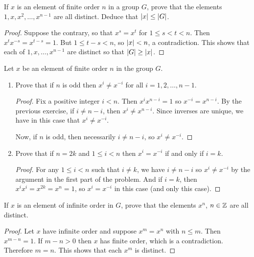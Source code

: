  If $x$ is an element of finite order $n$ in a group $G$,
prove that the elements $1, x, x^2, \dots, x^{n-1}$ are all
distinct. Deduce that $\lvert{x}\rvert\leq\lvert{G}\rvert$.
\begin{proof}
  Suppose the contrary, so that $x^s = x^t$ for $1\leq s < t<n$. Then
  $x^tx^{-s} = x^{t-s} = 1$. But $1\leq t-s < n$, so $\lvert{x}\rvert < n$, a
  contradiction. This shows that each of $1, x,\dots,x^{n-1}$ are
  distinct so that $\lvert{G}\rvert\geq\lvert{x}\rvert$.
\end{proof}

 Let $x$ be an element of finite order $n$ in the group
$G$.
\begin{enumerate}
\item Prove that if $n$ is odd then $x^i\neq x^{-i}$ for all
  $i = 1, 2, \dots, n-1$.
  \begin{proof}
    Fix a positive integer $i < n$. Then $x^ix^{n-i} = 1$ so
    $x^{-i} = x^{n-i}$. By the previous exercise, if $i\neq n-i$, then
    $x^i\neq x^{n-i}$. Since inverses are unique, we have in this case
    that $x^i\neq x^{-i}$.

    Now, if $n$ is odd, then necessarily $i\neq n-i$, so
    $x^i\neq x^{-i}$.
  \end{proof}
\item Prove that if $n = 2k$ and $1\leq i < n$ then $x^i = x^{-i}$ if
  and only if $i = k$.
  \begin{proof}
    For any $1\leq i<n$ such that $i\neq k$, we have $i\neq n-i$ so
    $x^i\neq x^{-i}$ by the argument in the first part of the
    problem. And if $i = k$, then $x^ix^i = x^{2k} = x^n = 1$, so
    $x^i = x^{-i}$ in this case (and only this case).
  \end{proof}
\end{enumerate}

 If $x$ is an element of infinite order in $G$, prove
that the elements $x^n$, $n\in\mathbb{Z}$ are all distinct.
\begin{proof}
  Let $x$ have infinite order and suppose $x^m = x^n$ with $n\leq
  m$. Then $x^{m-n} = 1$. If $m-n > 0$ then $x$ has finite order,
  which is a contradiction. Therefore $m = n$. This shows that each
  $x^m$ is distinct.
\end{proof}
